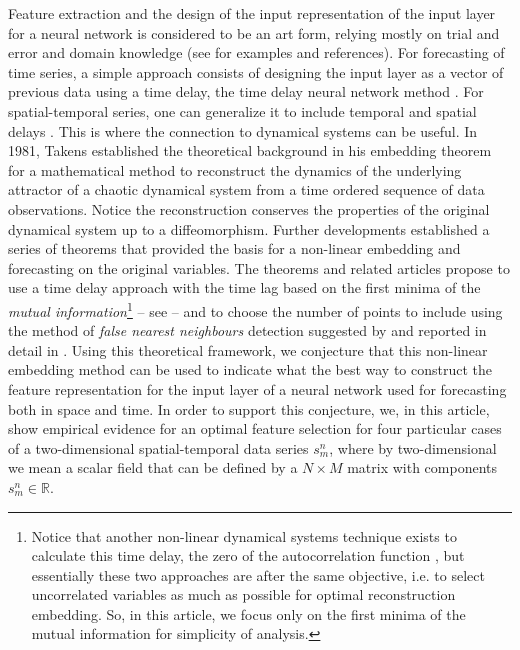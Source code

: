 \documentclass[journal]{IEEEtran}
\begin{document}
Feature extraction and the design of the input
representation of the 
input layer for a neural network is considered to be an art form, relying mostly on trial and error and domain knowledge (see \cite{5771385}
for examples and references). For 
forecasting of time series, a simple approach consists of designing the input layer as a vector of previous data using a time delay, the 
time delay neural network method \cite{Waibel:1990:PRU:108235.108263, luk2000study, 857903, Frank2001, OH2002249, 1009-1963-12-6-304, 
inputlayer}. For spatial-temporal series, one can generalize it to include temporal and spatial delays 
\cite{covas2016,covaspeixinhojoao}. This is where the connection to dynamical systems can be useful. In 1981, Takens established the 
theoretical background \cite{1981LNM...898..366T} in his embedding theorem for a mathematical method to reconstruct the dynamics 
of the underlying attractor of a chaotic dynamical system from a time ordered sequence of data observations. Notice the reconstruction 
conserves the properties of the original dynamical system up to a diffeomorphism. 
 Further developments established a series of theorems \cite{key1503303m, 1981LNM...898..230M, 1991JSP....65..579S}
 that provided the basis for a non-linear embedding and forecasting on the original variables. The 
theorems and related articles propose to use a time delay approach with the time lag based on the first minima of the 
{\em mutual information}\footnote{
Notice that another non-linear dynamical systems technique exists to calculate this time delay, the zero of the autocorrelation
function \cite{opac-b1092652,abarbanel1997analysis}, but essentially these two approaches are after the same objective, i.e.
to select uncorrelated 
 variables as much as possible for optimal reconstruction embedding. So, in this article, we focus only on the first minima
 of the mutual information for simplicity of analysis.
} -- see 
\cite{Fraser86, abarbanel1997analysis, opac-b1092652} -- and to choose the number of points to include using  the method of {\em false 
nearest neighbours} detection suggested by \cite{1992PhRvA..45.3403K} and reported in detail in \cite{1992PhRvA..45.7058M, 
1993RvMP...65.1331A, 1996PhT....49k..86A, abarbanel1997analysis}. Using this theoretical framework, we conjecture that this non-linear 
embedding method can be used to indicate what the best way to construct the feature representation for 
the input layer of a neural network used for forecasting both in space and time.
In order to support this conjecture, we, in this article, show empirical evidence for an optimal feature selection 
 for four particular cases of a two-dimensional
spatial-temporal data series $s^n_m$, where by two-dimensional we mean a scalar field that can be
defined by a $N \times M$ matrix with components $s^n_m \in \mathbb{R}$.
\end{document}

